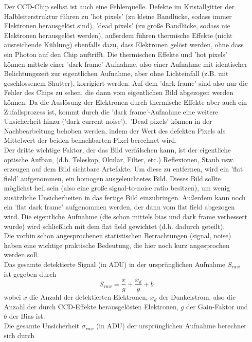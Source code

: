 Der CCD-Chip selbst ist auch eine Fehlerquelle. Defekte im Kristallgitter der Halbleiterstruktur führen zu 'hot pixels' (zu kleine Bandlücke, sodass immer Elektronen herausgelöst sind), 'dead pixels' (zu große Bandlücke, sodass nie Elektronen herausgelöst werden), außerdem führen thermische Effekte (nicht ausreichende Kühlung) ebenfalls dazu, dass Elektronen gelöst werden, ohne dass ein Photon auf den Chip auftrifft. Die thermischen Effekte und 'hot pixels' können mittels einer 'dark frame'-Aufnahme, also einer Aufnahme mit identischer Belichtungszeit zur eigentlichen Aufnahme, aber ohne Lichteinfall (z.B. mit geschlossenem Shutter), korrigiert werden. Auf dem 'dark frame' sind also nur die Fehler des Chips zu sehen, die dann vom eigentlichen Bild abgezogen werden können. Da die Auslösung der Elektronen durch thermische Effekte aber auch ein Zufallsprozess ist, kommt durch die 'dark frame'-Aufnahme eine weitere Unsicherheit hinzu ('dark current noise').\
'Dead pixels' können in der Nachbearbeitung behoben werden, indem der Wert des defekten Pixels als Mittelwert der beiden benachbarten Pixel berechnet wird.
\\
Der dritte wichtige Faktor, der das Bild verfälschen kann, ist der eigentliche optische Aufbau, (d.h. Teleskop, Okular, Filter, etc.) Reflexionen, Staub usw. erzeugen auf dem Bild sichtbare Artefakte. Um diese zu entfernen, wird ein 'flat field' aufgenommen, ein homogen ausgeleuchtetes Bild. Dieses Bild sollte möglichst hell sein (also eine große signal-to-noise ratio besitzen), um wenig zusätzliche Unsicherheiten in das fertige Bild einzubringen. Außerdem kann noch ein 'flat dark frame' aufgenommen werden, der dann vom flat field abgezogen wird. Die eigentliche Aufnahme (die schon mittels bias und dark frame verbessert wurde) wird schließlich mit dem flat field gewichtet (d.h. dadurch geteilt).
\\
Die vorhin schon angesprochenen statistischen Betrachtungen (signal, noise) haben eine wichtige praktische Bedeutung, die hier noch kurz angesprochen werden soll.
\\
Das gesamte detektierte Signal (in ADU) in der ursprünglichen Aufnahme $S_{raw}$ ist gegeben durch
\begin{equation}
S_{raw} = \frac{x}{g} + \frac{x_d}{g} + b
\end{equation}
wobei $x$ die Anzahl der detektierten Elektronen, $x_d$ der Dunkelstrom, also die Anzahl der durch CCD-Effekte herausgelösten Elektronen, $g$ der Gain-Faktor und $b$ der Bias ist.
\\
Die gesamte Unsicherheit $\sigma_{raw}$ (in ADU) der ursprünglichen Aufnahme berechnet sich durch 
